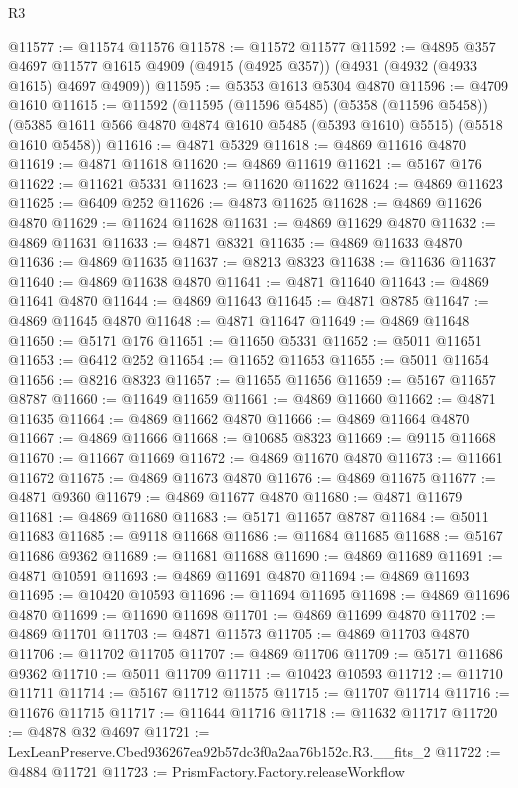 \begin{lexlean}{R3}
\begin{coremodule}
@11577 := @11574 @11576
@11578 := @11572 @11577
@11592 := @4895
    @357
    @4697
    @11577
    @1615
    @4909
    (@4915 (@4925 @357))
    (@4931 (@4932 (@4933 @1615) @4697 @4909))
@11595 := @5353 @1613 @5304 @4870
@11596 := @4709 @1610
@11615 := @11592
    (@11595
      (@11596 @5485)
      (@5358 (@11596 @5458))
      (@5385 @1611 @566 @4870 @4874 @1610 @5485 (@5393 @1610) @5515)
      (@5518 @1610 @5458))
@11616 := @4871 @5329
@11618 := @4869 @11616 @4870
@11619 := @4871 @11618
@11620 := @4869 @11619
@11621 := @5167 @176
@11622 := @11621 @5331
@11623 := @11620 @11622
@11624 := @4869 @11623
@11625 := @6409 @252
@11626 := @4873 @11625
@11628 := @4869 @11626 @4870
@11629 := @11624 @11628
@11631 := @4869 @11629 @4870
@11632 := @4869 @11631
@11633 := @4871 @8321
@11635 := @4869 @11633 @4870
@11636 := @4869 @11635
@11637 := @8213 @8323
@11638 := @11636 @11637
@11640 := @4869 @11638 @4870
@11641 := @4871 @11640
@11643 := @4869 @11641 @4870
@11644 := @4869 @11643
@11645 := @4871 @8785
@11647 := @4869 @11645 @4870
@11648 := @4871 @11647
@11649 := @4869 @11648
@11650 := @5171 @176
@11651 := @11650 @5331
@11652 := @5011 @11651
@11653 := @6412 @252
@11654 := @11652 @11653
@11655 := @5011 @11654
@11656 := @8216 @8323
@11657 := @11655 @11656
@11659 := @5167 @11657 @8787
@11660 := @11649 @11659
@11661 := @4869 @11660
@11662 := @4871 @11635
@11664 := @4869 @11662 @4870
@11666 := @4869 @11664 @4870
@11667 := @4869 @11666
@11668 := @10685 @8323
@11669 := @9115 @11668
@11670 := @11667 @11669
@11672 := @4869 @11670 @4870
@11673 := @11661 @11672
@11675 := @4869 @11673 @4870
@11676 := @4869 @11675
@11677 := @4871 @9360
@11679 := @4869 @11677 @4870
@11680 := @4871 @11679
@11681 := @4869 @11680
@11683 := @5171 @11657 @8787
@11684 := @5011 @11683
@11685 := @9118 @11668
@11686 := @11684 @11685
@11688 := @5167 @11686 @9362
@11689 := @11681 @11688
@11690 := @4869 @11689
@11691 := @4871 @10591
@11693 := @4869 @11691 @4870
@11694 := @4869 @11693
@11695 := @10420 @10593
@11696 := @11694 @11695
@11698 := @4869 @11696 @4870
@11699 := @11690 @11698
@11701 := @4869 @11699 @4870
@11702 := @4869 @11701
@11703 := @4871 @11573
@11705 := @4869 @11703 @4870
@11706 := @11702 @11705
@11707 := @4869 @11706
@11709 := @5171 @11686 @9362
@11710 := @5011 @11709
@11711 := @10423 @10593
@11712 := @11710 @11711
@11714 := @5167 @11712 @11575
@11715 := @11707 @11714
@11716 := @11676 @11715
@11717 := @11644 @11716
@11718 := @11632 @11717
@11720 := @4878 @32 @4697
@11721 := LexLeanPreserve.Cbed936267ea92b57dc3f0a2aa76b152c.R3.__fits_2
@11722 := @4884 @11721
@11723 := PrismFactory.Factory.releaseWorkflow

\end{coremodule}
\end{lexlean}
